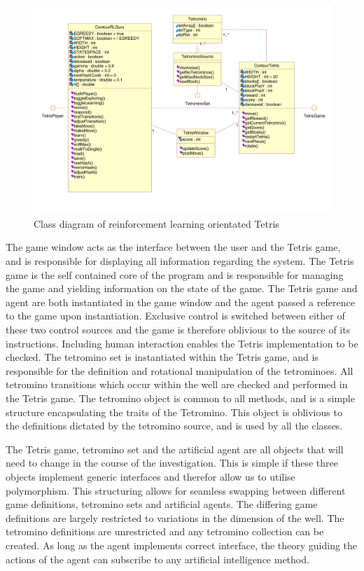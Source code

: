 \documentclass{rucsthesis}
\begin{document}
\begin{figure}[h]
\centering
\includegraphics[width=6in]{finaluml.png}
\caption{Class diagram of reinforcement learning orientated Tetris}
\label{fig:uml}
\end{figure}

The game window acts as the interface between the user and the Tetris game, and is responsible for displaying all information regarding the system. The Tetris game is the self contained core of the program and is responsible for managing the game and yielding information on the state of the game. The Tetris game and agent are both instantiated in the game window and the agent passed a reference to the game upon instantiation. Exclusive control is switched between either of these two control sources and the game is therefore oblivious to the source of its instructions.  Including human interaction enables the Tetris implementation to be checked. The tetromino set is instantiated within the Tetris game, and is responsible for the definition and rotational manipulation of the tetrominoes. All tetromino transitions which occur within the well are checked and performed in the Tetris game. The tetromino object is common to all methods, and is a simple structure encapsulating the traits of the Tetromino. This object is oblivious to the definitions dictated by the tetromino source, and is used by all the classes.

The Tetris game, tetromino set and the artificial agent are all objects that will need to change in the course of the investigation. This is simple if these three objects implement generic interfaces and therefor allow us to utilise polymorphism. This structuring allows for seamless swapping between different game definitions, tetromino sets and artificial agents. The differing game definitions are largely restricted to variations in the dimension of the well. The tetromino definitions are unrestricted and any tetromino collection can be created. As long as the agent implements correct interface, the theory guiding the actions of the agent can subscribe to any artificial intelligence method.
\end{document}
